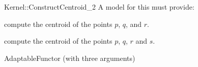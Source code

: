 \begin{ccRefFunctionObjectConcept}{Kernel::ConstructCentroid_2}
A model for this must provide:


 {compute the centroid of the points $p$, $q$, and $r$.}

 {compute the centroid of the points $p$, $q$, $r$ and $s$.}

\ccRefines
AdaptableFunctor (with three arguments)

\ccSeeAlso
{} \\

\end{ccRefFunctionObjectConcept}
